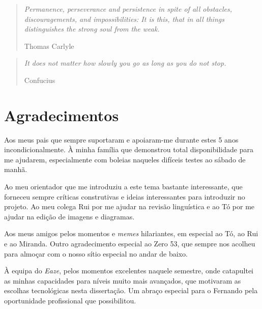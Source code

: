 
\clearpage
\vspace*{200pt}
\thispagestyle{empty} %
\begin{quotation}
\em %
Permanence, perseverance and persistence in spite of all obstacles, discouragements, and impossibilities: It is this, that in all things distinguishes the strong soul from the weak.

\medskip
\raggedleft
Thomas Carlyle
\end{quotation}
\vspace*{100pt}
\begin{quotation}
\em
It does not matter how slowly you go as long as you do not stop.

\medskip
\raggedleft
Confucius
\end{quotation}
\vspace*{\fill}


\chapter*{Agradecimentos}

Aos meus pais que sempre suportaram e apoiaram-me durante estes 5 anos incondicionalmente. À minha família que demonstrou total disponibilidade para me ajudarem, especialmente com boleias naqueles difíceis testes ao sábado de manhã.

Ao meu orientador que me introduziu a este tema bastante interessante, que forneceu sempre críticas construtivas e ideias interessantes para introduzir no projeto. Ao meu colega Rui por me ajudar na revisão linguística e ao Tó por me ajudar na edição de imagens e diagramas.

Aos meus amigos pelos momentos e \textit{memes} hilariantes, em especial ao Tó, ao Rui e ao Miranda. Outro agradecimento especial ao Zero 53, que sempre nos acolheu para almoçar com o nosso sítio especial no andar de baixo.

À equipa do \textit{Eaze}, pelos momentos excelentes naquele semestre, onde catapultei as minhas capacidades para níveis muito mais avançados, que motivaram as escolhas tecnológicas nesta dissertação. Um abraço especial para o Fernando pela oportunidade profissional que possibilitou.

